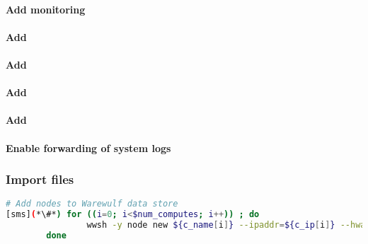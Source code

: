 \documentclass[letterpaper]{article}
\begin{document}
\clearpage
\paragraph{Add \Ganglia{} monitoring}


\paragraph{Add \clustershell{}}


\paragraph{Add \mrsh{}}


\paragraph{Add \genders{}}



\paragraph{Add \conman{}} \label{sec:add_conman}


\clearpage
\paragraph{Enable forwarding of system logs} \label{sec:add_syslog}


\subsubsection{Import files} \label{sec:file_import}








\begin{lstlisting}[language=bash,keywords={},upquote=true,basicstyle=\footnotesize\ttfamily]
# Add nodes to Warewulf data store
[sms](*\#*) for ((i=0; i<$num_computes; i++)) ; do
                wwsh -y node new ${c_name[i]} --ipaddr=${c_ip[i]} --hwaddr=${c_mac[i]} -D ${eth_provision}
        done
\end{lstlisting}
\end{document}
